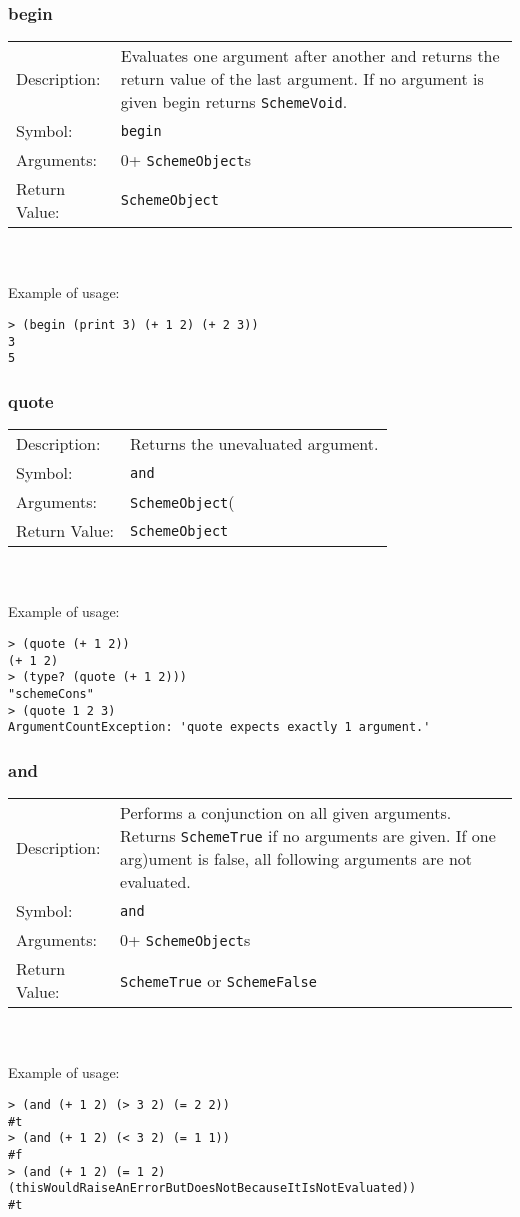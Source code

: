 \documentclass[12pt,a4paper]{scrartcl}
\begin{document}
\subsubsection*{begin}
\begin{tabular}{l  p{13cm}}
Description: & Evaluates one argument after another and returns the return value of the last argument. If no argument is given begin returns \lstinline{SchemeVoid}.\\
Symbol: & \lstinline{begin}\\
Arguments: & 0+ \lstinline{SchemeObject}s \\
Return Value: & \lstinline{SchemeObject} \\
\end{tabular}
\\
\\
Example of usage:
\begin{lstlisting}
> (begin (print 3) (+ 1 2) (+ 2 3))
3
5
\end{lstlisting}


\subsubsection{quote}
\begin{tabular}{l  p{13cm}}
Description: & Returns the unevaluated argument.\\
Symbol: & \lstinline{and}\\
Arguments: & \lstinline{SchemeObject}( \\
Return Value: & \lstinline{SchemeObject}\\
\end{tabular}
\\
\\
Example of usage:
\begin{lstlisting}
> (quote (+ 1 2))
(+ 1 2)
> (type? (quote (+ 1 2)))
"schemeCons"
> (quote 1 2 3)
ArgumentCountException: 'quote expects exactly 1 argument.' 
\end{lstlisting}

\subsubsection{and}
\begin{tabular}{l  p{13cm}}
Description: & Performs a conjunction on all given arguments. Returns \lstinline{SchemeTrue} if no arguments are given. If one arg)ument is false, all following arguments are not evaluated. \\
Symbol: & \lstinline{and}\\
Arguments: & 0+ \lstinline{SchemeObject}s \\
Return Value: & \lstinline{SchemeTrue} or \lstinline{SchemeFalse}\\
\end{tabular}
\\
\\
Example of usage:
\begin{lstlisting}
> (and (+ 1 2) (> 3 2) (= 2 2))
#t
> (and (+ 1 2) (< 3 2) (= 1 1))
#f
> (and (+ 1 2) (= 1 2) (thisWouldRaiseAnErrorButDoesNotBecauseItIsNotEvaluated))
#t
\end{lstlisting}
\end{document}
